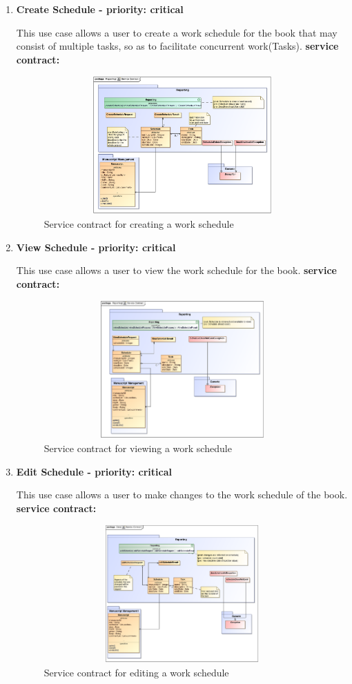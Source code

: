 \begin{enumerate}
\item \textbf{Create Schedule - priority: critical}
\par{This use case allows a user to create a work schedule for the book that may consist of multiple tasks, so as to facilitate concurrent work(Tasks).}
\textbf{service contract:} 
\begin{figure}[h]
\includegraphics[height=200px, width=500px]{epsImages/Reporting/createSchedule.eps}
\caption{Service contract for creating a work schedule}
\end{figure}

\item \textbf{View Schedule - priority: critical}
\par{This use case allows a user to view the work schedule for the book.}
\textbf{service contract:}
\begin{figure}[h]
\includegraphics[height=200px, width=500px]{epsImages/Reporting/viewSchedule.eps}
\caption{Service contract for viewing a work schedule}
\end{figure}

\item \textbf{Edit Schedule - priority: critical}
\par{This use case allows a user to make changes to the work schedule of the book.}
\textbf{service contract:}

\begin{figure}[h]
\includegraphics[height=200px, width=500px]{epsImages/Reporting/editSchedule.eps}
\caption{Service contract for editing a work schedule}
\end{figure}


\end{enumerate}
